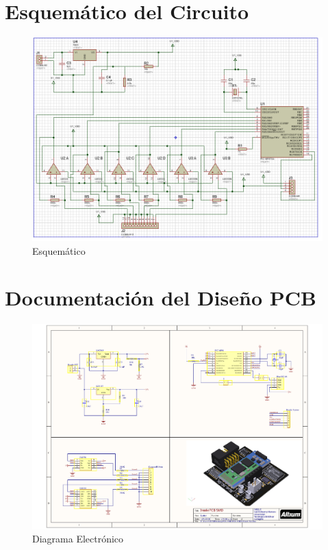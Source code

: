 \newpage

\section{Esquemático del Circuito}

\begin{figure}[H]
\centering
\includegraphics[width=1\textwidth]{./image/esquematico.png}
\caption{Esquemático}
\label{fig:esquematico}
\end{figure}

\newpage

\section{Documentación del Diseño PCB}

\begin{figure}[H]
\centering
\includegraphics[width=1\textwidth]{./Documentos_PDF/DiagramaElectronico.pdf}
\caption{Diagrama Electrónico}
\label{fig:DiagramaElectronico}
\end{figure}

